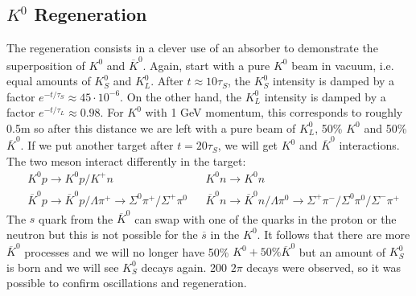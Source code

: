 \documentclass[10.75pt,a4paper,openright,bottom=2cm]{article}
\begin{document}
\subsection{$K^0$ Regeneration}
The regeneration consists in a clever use of an absorber to demonstrate the superposition of $K^0$ and $\overline{K}^0$. Again, start with a pure $K^0$ beam in vacuum, i.e. equal amounts of $K_S^0$ and $K_L^0$. After $t\approx10\tau_S$, the $K_S^0$ intensity is damped by a factor $e^{-t/\tau_S}\approx45\cdot10^{-6}$. On the other hand, the $K_L^0$ intensity is damped by a factor $e^{-t/\tau_L}\approx0.98$. For $K^0$ with 1 GeV momentum, this corresponds to roughly 0.5m so after this distance we are left with a pure beam of $K_L^0$, 50\% $K^0$ and 50\% $\overline{K}^0$. If we put another target after $t=20\tau_S$, we will get $K^0$ and $\overline{K}^0$ interactions. The two meson interact differently in the target:
\[
\begin{aligned}
&K^0p\to K^0p/K^+n &&K^0n\to K^0n\\
&\overline{K}^0p\to\overline{K}^0p/\Lambda\pi^+\to\Sigma^0\pi^+/\Sigma^+\pi^0 &&\overline{K}^0n\to\overline{K}^0n/\Lambda\pi^0\to\Sigma^+\pi^-/\Sigma^0\pi^0/\Sigma^-\pi^+
\end{aligned}
\]
The $s$ quark from the $\overline{K}^0$ can swap with one of the quarks in the proton or the neutron but this is not possible for the $\overline{s}$ in the $K^0$. It follows that there are more $\overline{K}^0$ processes and we will no longer have 50\% $K^0+50\%\overline{K}^0$ but an amount of $K_S^0$ is born and we will see $K_S^0$ decays again. 200 $2\pi$ decays were observed, so it was possible to confirm oscillations and regeneration. 
\end{document}
